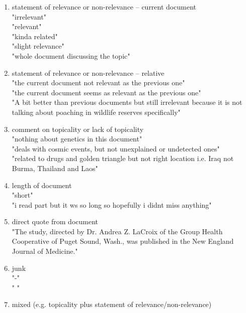 \begin{enumerate}
\item statement of relevance or non-relevance -- current document  \\
    "irrelevant"  \\
    "relevant"  \\
    "kinda related"  \\
    "slight relevance"  \\
    "whole document discussing the topic"  \\

\item statement of relevance or non-relevance -- relative  \\
    "the current document not relevant as the previous one"  \\
    "the current document seems as relevant as the previous one"  \\
    "A bit better than previous documents but still irrelevant because it is not talking about poaching in wildlife reserves specifically"  \\

\item comment on topicality or lack of topicality  \\
    "nothing about genetics in this document"  \\
    "deals with cosmic events, but not unexplained or undetected ones"  \\
    "related to drugs and golden triangle but not right location i.e. Iraq  not  Burma, Thailand and Laos"  \\

\item  length of document  \\
    "short"  \\
    "i read part but it ws so long so hopefully i didnt miss anything"  \\

\item direct quote from document  \\
    "The study, directed by Dr. Andrea Z. LaCroix of the Group Health Cooperative of Puget Sound, Wash., was published in the New England Journal of Medicine."  \\

\item junk  \\
    "-"  \\
    " "  \\

\item mixed (e.g. topicality plus statement of relevance/non-relevance)

\end{enumerate}





